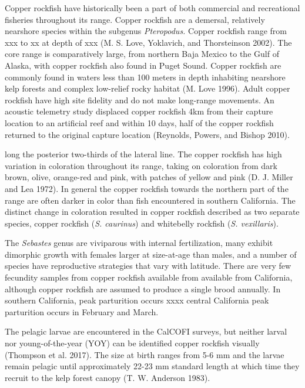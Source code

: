 \documentclass[11pt,
  english,
  letterpaper,
]{article}
\begin{document}
Copper rockfish have historically been a part of both commercial and recreational fisheries throughout its range. Copper rockfish are a demersal, relatively nearshore species within the subgenus \emph{Pteropodus.} Copper rockfish range from xxx to xx at depth of xxx (M. S. Love, Yoklavich, and Thorsteinson 2002). The core range is comparatively large, from northern Baja Mexico to the Gulf of Alaska, with copper rockfish also found in Puget Sound. Copper rockfish are commonly found in waters less than 100 meters in depth inhabiting nearshore kelp forests and complex low-relief rocky habitat (M. Love 1996). Adult copper rockfish have high site fidelity and do not make long-range movements. An acoustic telemetry study displaced copper rockfish 4km from their capture location to an artificial reef and within 10 days, half of the copper rockfish returned to the original capture location (Reynolds, Powers, and Bishop 2010).

long the posterior two-thirds of the lateral line. The copper rockfish has high variation in coloration throughout its range, taking on coloration from dark brown, olive, orange-red and pink, with patches of yellow and pink (D. J. Miller and Lea 1972). In general the copper rockfish towards the northern part of the range are often darker in color than fish encountered in southern California. The distinct change in coloration resulted in copper rockfish described as two separate species, copper rockfish (\emph{S. caurinus}) and whitebelly rockfish (\emph{S. vexillaris}).

The \emph{Sebastes} genus are viviparous with internal fertilization, many exhibit dimorphic growth with females larger at size-at-age than males, and a number of species have reproductive strategies that vary with latitude. There are very few fecundity samples from copper rockfish available from available from California, although copper rockfish are assumed to produce a single brood annually. In southern California, peak parturition occurs xxxx central California peak parturition occurs in February and March.

The pelagic larvae are encountered in the CalCOFI surveys, but neither larval nor young-of-the-year (YOY) can be identified copper rockfish visually (Thompson et al. 2017). The size at birth ranges from 5-6 mm and the larvae remain pelagic until approximately 22-23 mm standard length at which time they recruit to the kelp forest canopy (T. W. Anderson 1983).
\end{document}
